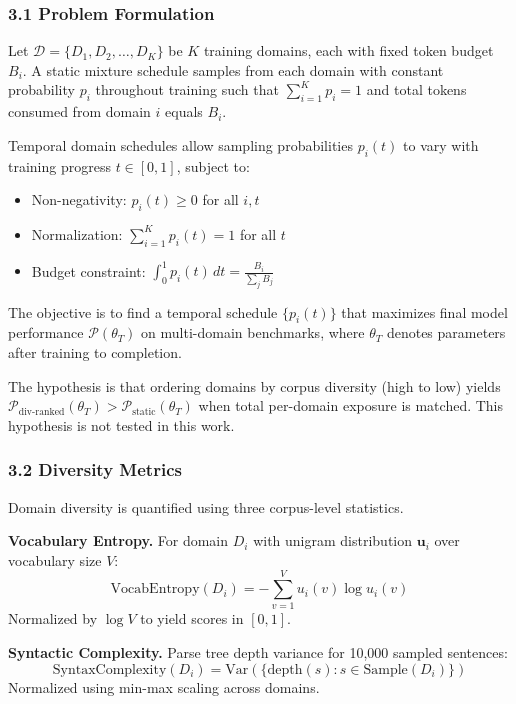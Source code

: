 
\subsubsection{3.1 Problem Formulation}

Let $\mathcal{D} = \{D_1, D_2, \ldots, D_K\}$ be $K$ training domains, each with fixed token budget $B_i$. A static mixture schedule samples from each domain with constant probability $p_i$ throughout training such that $\sum_{i=1}^K p_i = 1$ and total tokens consumed from domain $i$ equals $B_i$.

Temporal domain schedules allow sampling probabilities $p_i(t)$ to vary with training progress $t \in [0, 1]$, subject to:
\begin{itemize}
\item Non-negativity: $p_i(t) \geq 0$ for all $i, t$
\item Normalization: $\sum_{i=1}^K p_i(t) = 1$ for all $t$
\item Budget constraint: $\int_0^1 p_i(t) \, dt = \frac{B_i}{\sum_j B_j}$
\end{itemize}

The objective is to find a temporal schedule $\{p_i(t)\}$ that maximizes final model performance $\mathcal{P}(\theta_T)$ on multi-domain benchmarks, where $\theta_T$ denotes parameters after training to completion.

The hypothesis is that ordering domains by corpus diversity (high to low) yields $\mathcal{P}_{\text{div-ranked}}(\theta_T) > \mathcal{P}_{\text{static}}(\theta_T)$ when total per-domain exposure is matched. This hypothesis is not tested in this work.

\subsubsection{3.2 Diversity Metrics}

Domain diversity is quantified using three corpus-level statistics.

\textbf{Vocabulary Entropy.} For domain $D_i$ with unigram distribution $\mathbf{u}_i$ over vocabulary size $V$:
$$\text{VocabEntropy}(D_i) = -\sum_{v=1}^V u_i(v) \log u_i(v)$$
Normalized by $\log V$ to yield scores in $[0, 1]$.

\textbf{Syntactic Complexity.} Parse tree depth variance for 10,000 sampled sentences:
$$\text{SyntaxComplexity}(D_i) = \text{Var}(\{\text{depth}(s) : s \in \text{Sample}(D_i)\})$$
Normalized using min-max scaling across domains.

